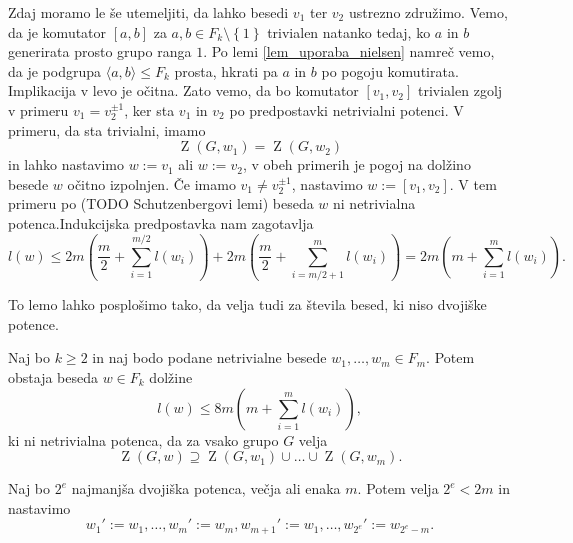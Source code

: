 \documentclass[mat1, tisk]{fmfdelo}
\numberwithin{equation}{section}  %
\begin{document}
\begin{dokaz}
        Zdaj moramo le še utemeljiti, da lahko besedi $v_1$ ter $v_2$ ustrezno združimo. Vemo, da je komutator $[a,b]$ za $a,b \in F_k \setminus \left\{ 1\right\}$ trivialen natanko tedaj, ko $a$ in $b$ generirata prosto grupo ranga $1$. Po lemi \ref{lem_uporaba_nielsen} namreč vemo, da je podgrupa $\langle a, b \rangle \le F_k$ prosta,
        hkrati pa $a$ in $b$ po pogoju komutirata. Implikacija v levo je očitna. Zato vemo, da bo komutator $[v_1, v_2]$ trivialen zgolj v primeru $v_1 = v_2^{\pm 1}$, ker sta $v_1$ in $v_2$ po predpostavki netrivialni potenci. V primeru, da sta trivialni, imamo \begin{equation*}
        \operatorname{Z}(G, w_1) = \operatorname{Z}(G, w_2)
        \end{equation*}  
         in lahko nastavimo $w := v_1$ ali $w := v_2$, v obeh primerih je pogoj na dolžino besede $w$ očitno izpolnjen. Če imamo $v_1 \neq v_2^{\pm 1}$, nastavimo $w := [v_1, v_2]$. V tem primeru po (TODO Schutzenbergovi lemi) beseda $w$ ni netrivialna potenca.Indukcijska predpostavka nam zagotavlja 
         \begin{equation*}
         l(w) \le 2m  \left(\frac{m}{2} + \sum_{i=1}^{m / 2} l(w_{i}) \right) + 2m \left(\frac{m}{2} + \sum_{i= m / 2 + 1}^{m} l(w_{i}) \right) = 2m \left( m + \sum_{i = 1}^{m} l(w_{i}) \right).
         \end{equation*}  
    \end{dokaz}

To lemo lahko posplošimo tako, da velja tudi za števila besed, ki niso dvojiške potence.

\begin{lema}
\label{lem_komutatorska_lema_posplositev}
Naj bo $k \ge 2$ in naj bodo podane netrivialne besede $w_1, \ldots, w_{m} \in  F_m$. Potem obstaja beseda $w \in F_k$ dolžine \begin{equation*}
l(w) \le 8m \left(m +  \sum_{i = 1}^{m} l(w_{i}) \right),
\end{equation*}  
ki ni netrivialna potenca, da za vsako grupo $G$ velja \begin{equation*}
\operatorname{Z}(G, w) \supseteq \operatorname{Z}(G, w_1) \cup \ldots \cup  \operatorname{Z}(G, w_{m}).
\end{equation*}    
\end{lema}
\begin{dokaz}
    Naj bo $2^{e}$ najmanjša dvojiška potenca, večja ali enaka $m$. Potem velja $2^{e} < 2m$ in nastavimo \begin{equation*}
    w_1' := w_1, \ldots, w_{m}' := w_{m}, w_{m+1}' := w_1, \ldots, w_{2^{e}}' := w_{2^{e} - m}. 
    \end{equation*}  
\end{dokaz}
\end{document}

